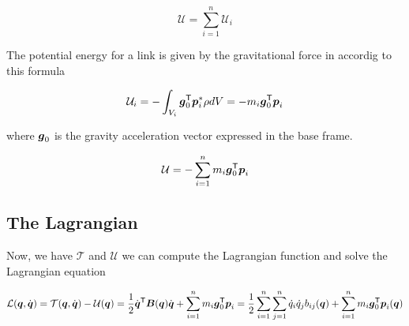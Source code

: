 \[
	\mathcal{U} = \sum_{i=1}^n \mathcal{U}_i
\]

The potential energy for a link is given by the gravitational force in accordig to this formula

\[
	\mathcal{U}_i = - \int_{V_i} \boldsymbol{g}_0^{\mathsf{T}} \boldsymbol{p}_i^* \rho dV =
	- m_i \boldsymbol{g}_0^{\mathsf{T}} \boldsymbol{p}_i
\]

where $\boldsymbol{g}_0$ is the gravity acceleration vector expressed in the base frame.

\[
	\mathcal{U} = - \sum_{i=1}^n m_i \boldsymbol{g}_0^{\mathsf{T}} \boldsymbol{p}_i
\]

\subsection{The Lagrangian}

Now, we have $\mathcal{T}$ and $\mathcal{U}$ we can compute the Lagrangian function and solve the Lagrangian equation

\[
	\mathcal{L}(\boldsymbol{q},\dot{\boldsymbol{q}}) = \mathcal{T}(\boldsymbol{q},\dot{\boldsymbol{q}}) - \mathcal{U}(\boldsymbol{q}) =
	\frac{1}{2} \dot{\boldsymbol{q}}^{\mathsf{T}} \boldsymbol{B}(\boldsymbol{q}) \dot{\boldsymbol{q}} + \sum_{i=1}^n m_i \boldsymbol{g}_0^{\mathsf{T}} \boldsymbol{p}_i =
	\frac{1}{2} \sum_{i=1}^n \sum_{j=1}^n \dot{q}_i \dot{q}_j b_{ij}(\boldsymbol{q}) + \sum_{i=1}^n m_i \boldsymbol{g}_0^{\mathsf{T}} \boldsymbol{p}_i(\boldsymbol{q})
\]